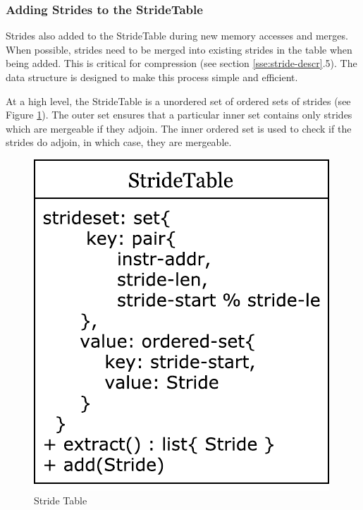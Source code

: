\documentclass[12pt,twoside]{reedthesis}
\begin{document}
			
			
		
		\subsubsection{Adding Strides to the StrideTable}
			
			Strides also added to the StrideTable during new memory accesses and merges. 			
			When possible, strides need to be merged into existing strides in the table when being added. This is critical for compression (see section \ref{sse:stride-descr}.5). The data structure is designed to make this process simple and efficient. 
			
			At a high level, the StrideTable is a unordered set of ordered sets of strides (see Figure \ref{fig:stride-table}). The outer set ensures that a particular inner set contains only strides which are mergeable if they adjoin. The inner ordered set is used to check if the strides do adjoin, in which case, they are mergeable.
			
			\begin{figure}[h]
				\caption{Stride Table}
				\label{fig:stride-table}
				\includegraphics[scale=0.8]{stride_data.pdf}
			\end{figure}
			 
\end{document}
